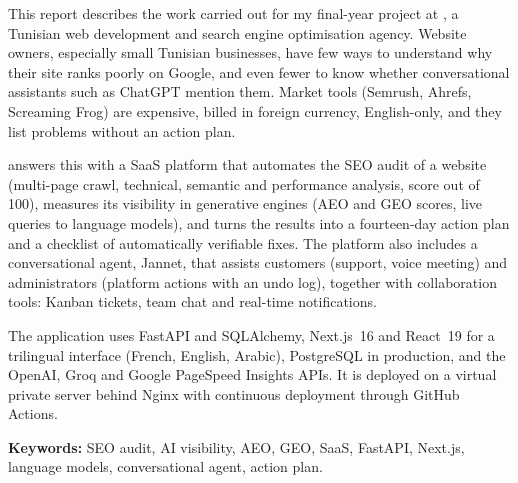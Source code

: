 This report describes the work carried out for my final-year project at \organisme, a Tunisian web development and search engine optimisation agency. Website owners, especially small Tunisian businesses, have few ways to understand why their site ranks poorly on Google, and even fewer to know whether conversational assistants such as ChatGPT mention them. Market tools (Semrush, Ahrefs, Screaming Frog) are expensive, billed in foreign currency, English-only, and they list problems without an action plan.

\xapp{} answers this with a SaaS platform that automates the SEO audit of a website (multi-page crawl, technical, semantic and performance analysis, score out of 100), measures its visibility in generative engines (AEO and GEO scores, live queries to language models), and turns the results into a fourteen-day action plan and a checklist of automatically verifiable fixes. The platform also includes a conversational agent, Jannet, that assists customers (support, voice meeting) and administrators (platform actions with an undo log), together with collaboration tools: Kanban tickets, team chat and real-time notifications.

The application uses FastAPI and SQLAlchemy, Next.js~16 and React~19 for a trilingual interface (French, English, Arabic), PostgreSQL in production, and the OpenAI, Groq and Google PageSpeed Insights APIs. It is deployed on a virtual private server behind Nginx with continuous deployment through GitHub Actions.

\medskip
\noindent\textbf{Keywords:} SEO audit, AI visibility, AEO, GEO, SaaS, FastAPI, Next.js, language models, conversational agent, action plan.

